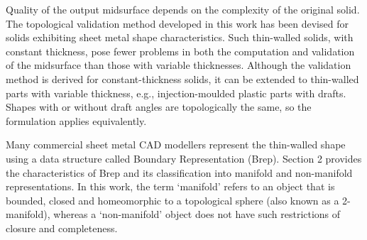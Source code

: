 \documentclass[11pt,a4paper]{article}
\newtheorem{definition}[theorem]{Definition}
\begin{document}
%
%

Quality of the output midsurface depends on the complexity of the original
solid. The topological validation method developed in this work has been
devised for solids exhibiting sheet metal shape characteristics. Such
thin-walled solids, with constant thickness, pose fewer problems in both the
computation and validation of the midsurface than those with variable
thicknesses. Although the validation method is derived for constant-thickness
solids, it can be extended to thin-walled parts with variable thickness, e.g.,
injection-moulded plastic parts with drafts. Shapes with or without draft
angles are topologically the same, so the formulation applies equivalently.


Many commercial sheet metal CAD modellers represent the thin-walled shape
using a data structure called Boundary Representation (Brep). Section 2
provides the characteristics of Brep and its classification into manifold
and non-manifold representations. In this work, the term `manifold' refers
to an object that is bounded, closed and homeomorphic to a topological sphere
(also known as a 2-manifold), whereas a `non-manifold' object does not have
such restrictions of closure and completeness.
\end{document}
